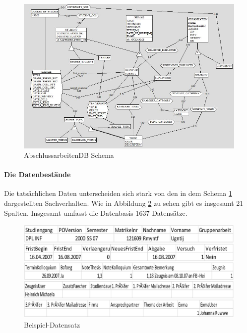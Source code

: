 \begin{figure}[H]
	\centering
	\includegraphics[scale=0.6]{images/01abschlussarbeitendbschema.jpg} 
	\caption{AbschlussarbeitenDB Schema}\label{fig:schema1}
\end{figure}

\paragraph{Die Datenbest\"ande}
Die tats\"achlichen Daten unterscheiden sich stark von den in dem Schema \ref{fig:schema1} dargestellten Sachverhalten. Wie in Abbildung \ref{fig:schema2} zu sehen gibt es insgesamt 21 Spalten. Insgesamt umfasst die Datenbasis 1637 Datensätze. \\

\begin{figure}[H]
	\centering
	\includegraphics[scale=0.3]{images/01beispieldatensatzcsv.jpg} 
	\caption{Beispiel-Datensatz}\label{fig:schema2}
\end{figure}


